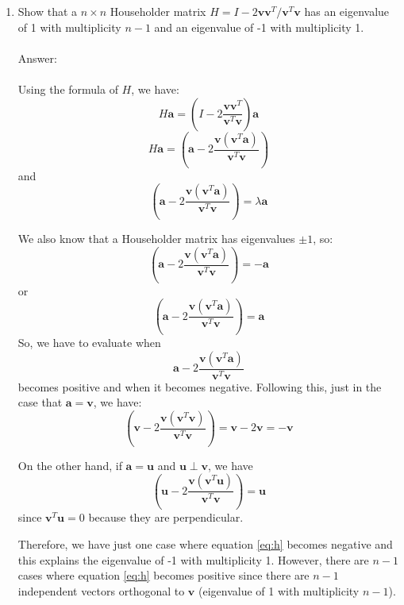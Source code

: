 \documentclass{article}
\renewcommand{\vec}[1]{\mathbf{#1}}
\renewcommand{\v}{\vec{v}}
\renewcommand{\a}{\vec{a}}
\renewcommand{\u}{\vec{u}}
\begin{document}
\begin{enumerate}
\item Show that a $n \times n$ Householder matrix $H = I - 2 \v\v^T / \v^T\v$ has an eigenvalue of 1 with multiplicity $n-1$ and an eigenvalue
of -1 with multiplicity 1.\\
\\
Answer:\\
\\
Using the formula of $H$, we have:
$$H\a = \left(I-2\frac{\v\v^T}{\v^T\v}\right)\a$$
$$H\a = \left(\a-2\frac{\v(\v^T\a)}{\v^T\v}\right)$$
and 
$$\left(\a-2\frac{\v(\v^T\a)}{\v^T\v}\right)=\lambda\a$$

We also know that a Householder matrix has eigenvalues $\pm1$, so:
$$\left(\a-2\frac{\v(\v^T\a)}{\v^T\v}\right)=-\a$$
or
$$\left(\a-2\frac{\v(\v^T\a)}{\v^T\v}\right)=\a$$
So, we have to evaluate when 
\begin{equation}\label{eq:h}
 \a-2\frac{\v(\v^T\a)}{\v^T\v}
\end{equation}
becomes positive and when it becomes negative. Following this, just in the case that $\a=\v$, we have:
$$\left(\v-2\frac{\v(\v^T\v)}{\v^T\v}\right)=\v-2\v=-\v$$

On the other hand, if $\a=\u$ and $\u\perp\v$, we have
$$\left(\u-2\frac{\v(\v^T\u)}{\v^T\v}\right)=\u$$
since $\v^T\u=0$ because they are perpendicular.

Therefore, we have just one case where equation \ref{eq:h} becomes negative and this explains the eigenvalue of -1 with multiplicity 1.  However, there are $n-1$ cases where equation  \ref{eq:h} becomes positive since there are $n-1$ independent vectors orthogonal to $\v$ (eigenvalue of 1 with multiplicity $n-1$).


\end{enumerate}
\end{document}

